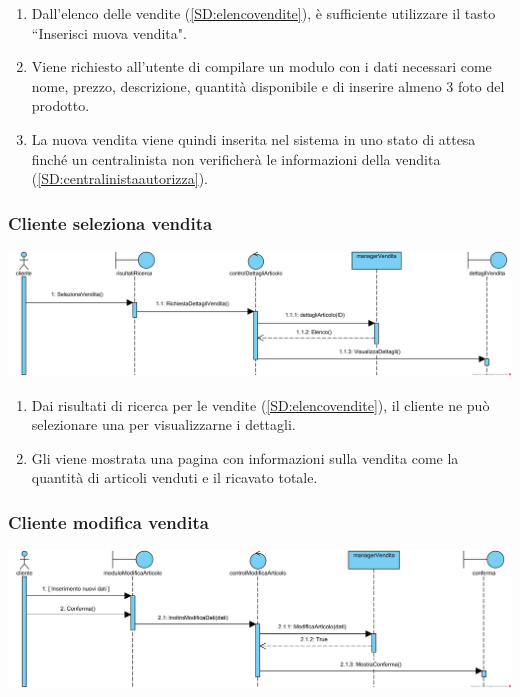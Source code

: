 \documentclass[12pt]{article}
\begin{document}
\begin{enumerate}
\item Dall'elenco delle vendite (\ref{SD:elencovendite}), è sufficiente utilizzare il tasto ``Inserisci nuova vendita".
\item Viene richiesto all'utente di compilare un modulo con i dati necessari come nome, prezzo, descrizione, quantità disponibile e di inserire almeno 3 foto del prodotto.
\item La nuova vendita viene quindi inserita nel sistema in uno stato di attesa finché un centralinista non verificherà le informazioni della vendita (\ref{SD:centralinistaautorizza}).
\end{enumerate}

\subsubsection{Cliente seleziona vendita}
\label{SD:selezionavenditacliente}

\begin{center}
\includegraphics[width=\textwidth]{SequenceDiagram/ClienteVenditaSeleziona}
\end{center}

\begin{enumerate}
\item Dai risultati di ricerca per le vendite (\ref{SD:elencovendite}), il cliente ne può selezionare una per visualizzarne i dettagli.
\item Gli viene mostrata una pagina con informazioni sulla vendita come la quantità di articoli venduti e il ricavato totale.
\end{enumerate}

\subsubsection{Cliente modifica vendita}
\label{SD:modificavendita}

\begin{center}
\includegraphics[width=\textwidth]{SequenceDiagram/ClienteVenditaModifica}
\end{center}
\end{document}
